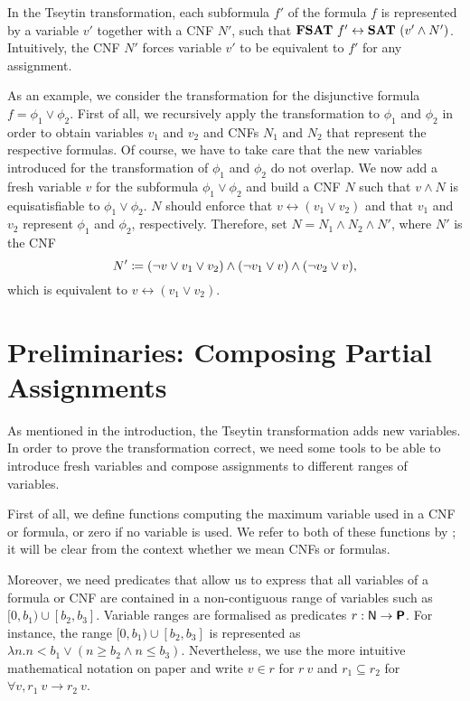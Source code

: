 In the Tseytin transformation, each subformula $f'$ of the formula $f$ is represented by a variable $v'$ together with a CNF $N'$, such that $\textbf{FSAT}{}~f' \leftrightarrow \textbf{SAT}{}~(v' \land N')$. Intuitively, the CNF $N'$ forces variable $v'$ to be equivalent to $f'$ for any assignment.
\begin{example}
  As an example, we consider the transformation for the disjunctive formula $f = \phi_1 \lor \phi_2$. First of all, we recursively apply the transformation to $\phi_1$ and $\phi_2$ in order to obtain variables $v_1$ and $v_2$ and CNFs $N_1$ and $N_2$ that represent the respective formulas. Of course, we have to take care that the new variables introduced for the transformation of $\phi_1$ and $\phi_2$ do not overlap.
  We now add a fresh variable $v$ for the subformula $\phi_1 \lor \phi_2$ and build a CNF $N$ such that $v \land N$ is equisatisfiable to $\phi_1 \lor \phi_2$. $N$ should enforce that $v \leftrightarrow (v_1 \lor v_2)$ and that $v_1$ and $v_2$ represent $\phi_1$ and $\phi_2$, respectively.
  Therefore, set $N = N_1 \land N_2 \land N'$, where $N'$ is the CNF 
  \[ N' \coloneqq (\lnot v \lor v_1 \lor v_2) \land (\lnot v_1  \lor v) \land (\lnot v_2 \lor v), \]
  which is equivalent to $v \leftrightarrow (v_1 \lor v_2)$.
\end{example}

\section{Preliminaries: Composing Partial Assignments}\label{sec:tseytin_prelim}
As mentioned in the introduction, the Tseytin transformation adds new variables. In order to prove the transformation correct, we need some tools to be able to introduce fresh variables and compose assignments to different ranges of variables.

First of all, we define functions computing the maximum variable used in a CNF or formula, or zero if no variable is used. We refer to both of these functions by \mnotec{\maxVar{}}; it will be clear from the context whether we mean CNFs or formulas. 

\newcommand{\inlit}{\ensuremath{\in_{\textsf{lit}}}}
\newcommand{\inclause}{\ensuremath{\in_{\textsf{clause}}}}
\newcommand{\incnf}{\ensuremath{\in_{\textsf{cnf}}}}
\newcommand{\infor}{\ensuremath{\in_{\formula}}}
Moreover, we need predicates that allow us to express that all variables of a formula or CNF are contained in a non-contiguous range of variables such as $[0, b_1) \cup [b_2, b_3]$. 
Variable ranges are formalised as predicates $r : \mathsf{N} \rightarrow \textsf{\bfseries P}$. For instance, the range $[0, b_1) \cup [b_2, b_3]$ is represented as $\lambda n. n < b_1 \lor (n \ge b_2 \land n \le b_3)$. Nevertheless, we use the more intuitive mathematical notation on paper and write $v \in r$ for $r~v$ and $r_1 \subseteq r_2$ for $\forall v, r_1~v \rightarrow r_2~v$.


